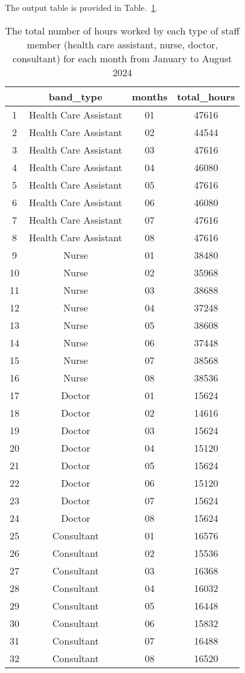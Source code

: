 \documentclass{article}
\begin{document}
The output table is provided in Table.~\ref{tab:task6}.

\begin{table}[h]
    \centering
\begin{tabular}{|c|c|c|c|}
\hline & band\_type & months & total\_hours \\
\hline 1 & Health Care Assistant & 01 & 47616 \\
\hline 2 & Health Care Assistant & 02 & 44544 \\
\hline 3 & Health Care Assistant & 03 & 47616 \\
\hline 4 & Health Care Assistant & 04 & 46080 \\
\hline 5 & Health Care Assistant & 05 & 47616 \\
\hline 6 & Health Care Assistant & 06 & 46080 \\
\hline 7 & Health Care Assistant & 07 & 47616 \\
\hline 8 & Health Care Assistant & 08 & 47616 \\
\hline 9 & Nurse & 01 & 38480 \\
\hline 10 & Nurse & 02 & 35968 \\
\hline 11 & Nurse & 03 & 38688 \\
\hline 12 & Nurse & 04 & 37248 \\
\hline 13 & Nurse & 05 & 38608 \\
\hline 14 & Nurse & 06 & 37448 \\
\hline 15 & Nurse & 07 & 38568 \\
\hline 16 & Nurse & 08 & 38536 \\
\hline 17 & Doctor & 01 & 15624 \\
\hline 18 & Doctor & 02 & 14616 \\
\hline 19 & Doctor & 03 & 15624 \\
\hline 20 & Doctor & 04 & 15120 \\
\hline 21 & Doctor & 05 & 15624 \\
\hline 22 & Doctor & 06 & 15120 \\
\hline 23 & Doctor & 07 & 15624 \\
\hline 24 & Doctor & 08 & 15624 \\
\hline 25 & Consultant & 01 & 16576 \\
\hline 26 & Consultant & 02 & 15536 \\
\hline 27 & Consultant & 03 & 16368 \\
\hline 28 & Consultant & 04 & 16032 \\
\hline 29 & Consultant & 05 & 16448 \\
\hline 30 & Consultant & 06 & 15832 \\
\hline 31 & Consultant & 07 & 16488 \\
\hline 32 & Consultant & 08 & 16520 \\
\hline
\end{tabular}
   \caption{The total number of hours worked by each type of staff member (health care assistant,
nurse, doctor, consultant) for each month from January to August 2024}
    \label{tab:task6}
\end{table}
\end{document}
